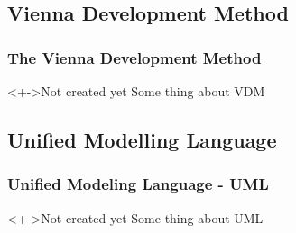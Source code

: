 \subsection{Vienna Development Method}
%
%
\frame
{
  \frametitle{The Vienna Development Method}

\begin{center}
	\begin{block}<+->{Not created yet}
	Some thing about VDM
	\end{block}

\end{center}
}

\subsection{Unified Modelling Language}
%
%
\frame
{
  \frametitle{Unified Modeling Language - UML}

\begin{center}

	\begin{block}<+->{Not created yet}
	Some thing about UML
	\end{block}

\end{center}
}
